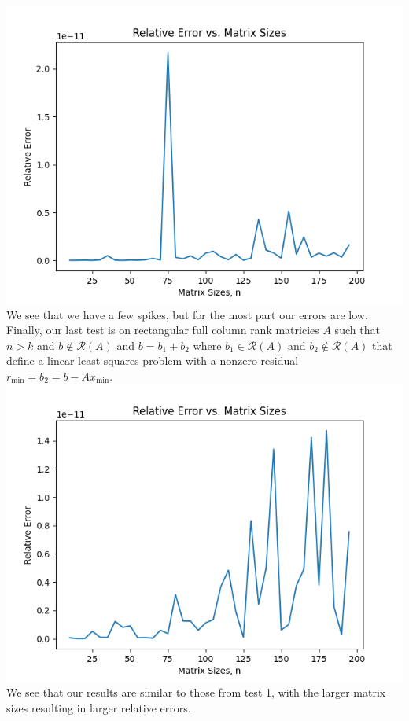 \documentclass{article}
\begin{document}
\includegraphics[width=\linewidth]{Images/Figure_2.png}\newline
We see that we have a few spikes, but for the most part our errors are low.\newline\newline
Finally, our last test is on rectangular full column rank matricies $A$ such that $n>k$ and $b\notin\mathcal{R}(A)$ and $b=b_1+b_2$ 
where $b_1\in\mathcal{R}(A)$ and $b_2\notin\mathcal{R}(A)$ that define a linear least squares problem with a nonzero 
residual $r_{\min} = b_2 = b-Ax_{\min}$.\newline
\includegraphics[width=\linewidth]{Images/Figure_3.png}\newline
We see that our results are similar to those from test 1, with the larger matrix sizes resulting in larger relative errors.
\end{document}

